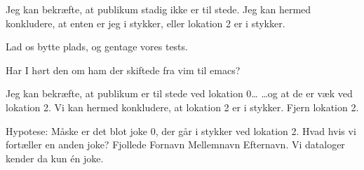 \documentclass[a4paper,11pt]{article}
\begin{document}
\begin{sketch}

 Jeg kan bekræfte, at publikum stadig ikke er til stede.
         Jeg kan hermed konkludere, at enten er jeg i stykker, eller lokation 2 er i stykker.


 Lad os bytte plads, og gentage vores tests.


 Har I hørt den om ham der skiftede fra vim til emacs?


 Jeg kan bekræfte, at publikum er til stede ved lokation 0\ldots
{} \ldots og at de er væk ved lokation 2.
 Vi kan hermed konkludere, at lokation 2 er i stykker. Fjern lokation 2.


 Hypotese: Måske er det blot joke 0, der går i stykker ved lokation 2. Hvad hvis vi fortæller en anden joke?
 Fjollede Fornavn Mellemnavn Efternavn. Vi dataloger kender da kun én joke.


\end{sketch}
\end{document}
